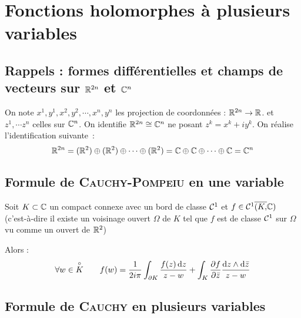 \documentclass[a4paper]{book}
\begin{document}
\chapter{Fonctions holomorphes à plusieurs variables}
\section{Rappels : formes différentielles et champs de vecteurs sur $\mathbb{R}^{2n}$ et $\mathbb{C}^n$}
On note $x^1,y^1,x^2,y^2,\cdots,x^n,y^n$ les projection de coordonnées : $\mathbb{R}^{2n} \rightarrow \mathbb{R}$. et $z^1,\cdots z^n$ celles sur $\mathbb{C}^n$.
On identifie $\mathbb{R}^{2n} \cong \mathbb{C}^n$ ne posant $z^k = x^k + i y^k$.
On réalise l'identification suivante~:
\[
\mathbb{R}^{2n} = (\mathbb{R}^2) \oplus (\mathbb{R}^2) \oplus \cdots \oplus (\mathbb{R}^2) = \mathbb{C} \oplus \mathbb{C} \oplus \cdots \oplus \mathbb{C} = \mathbb{C}^n
\]
\section{Formule de \textsc{Cauchy}-\textsc{Pompeiu} en une variable}
\begin{thm}
Soit $K \subset \mathbb{C}$ un compact connexe avec un bord de classe $\mathcal{C}^1$ et $f \in \mathcal{C}^1\overline{(K,}\mathbb{C})$ (c'est-à-dire il existe un voisinage ouvert $\Omega$ de $K$ tel que $f$ est de classe $\mathcal{C}^1$ sur $\Omega$ vu comme un ouvert de $\mathbb{R}^2$)

Alors :
\[
\forall w \in \overset{\circ}{K}  \qquad f(w) =\dfrac{1}{2i\pi} \int_{\partial K} \dfrac{f(z) \operatorname{d\!} z}{z-w} + 
\int_K \dfrac{\partial{f}}{\partial{\bar{z}}} \dfrac{\operatorname{d\!} z \wedge \operatorname{d\!} \bar{z}}{z-w}
\]
\end{thm}
\section{Formule de \textsc{Cauchy} en plusieurs variables}
\end{document}
